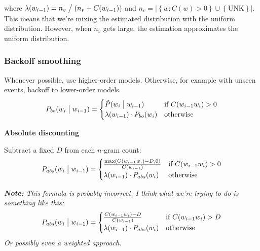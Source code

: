 \documentclass[11pt]{article}
\begin{document}
where $\lambda(w_{i-1}) = n_v \bigm/ (n_v + C(w_{i-1}))$ and $n_v = \left|\left\{w : C(w) > 0 \right\} \cup \left\{\mbox{UNK} \right\}\right|$. This means that we're mixing the estimated distribution with the uniform distribution. However, when $n_v$ gets large, the estimation approximates the uniform distribution.

\subsubsection{Backoff smoothing}

Whenever possible, use higher-order models. Otherwise, for example with unseen events, backoff to lower-order models.
\begin{equation*}
    P_{bo}(w_i \bigm| w_{i-1}) = \begin{cases}
        \tilde{P}(w_i \bigm| w_{i-1}) & \mbox{if } C(w_{i-1}w_i) > 0 \\
        \lambda(w_{i-1}) \cdot P_{bo}(w_i) & \mbox{otherwise}
                                 \end{cases}
\end{equation*}

\vspace{20pt}
\textbf{Absolute discounting}
\vspace{10pt}

Subtract a fixed $D$ from each $n$-gram count:
\begin{equation*}
    P_{abs}(w_i \bigm| w_{i-1}) = \begin{cases}
        \frac{\max(C(w_{i-1}w_i)-D, 0)}{C(w_{i-1})} & \mbox{if } C(w_{i-1}w_i) > 0 \\
        \lambda(w_{i-1}) \cdot P_{abs}(w_i) & \mbox{otherwise}
                                 \end{cases}
\end{equation*}

\vspace{10pt}

\textit{\textbf{Note:} This formula is probably incorrect. I think what we're trying to do is something like this:
    \begin{equation*}
        P_{abs}(w_i \bigm| w_{i-1}) = \begin{cases}
            \frac{C(w_{i-1}w_i) - D}{C(w_{i-1})} & \mbox{if } C(w_{i-1}w_i) > D \\
            \lambda(w_{i-1}) \cdot P_{abs}(w_i) & \mbox{otherwise}
        \end{cases}
    \end{equation*}
    Or possibly even a weighted approach.
}
\end{document}
